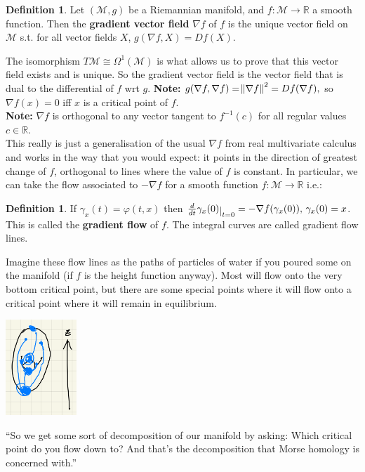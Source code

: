 \documentclass[10pt]{article}
\theoremstyle{plain}
\theoremstyle{definition}
\newtheorem{defn}[thm]{Definition} %
\newcommand{\Note}{\textbf{Note: }}
\newcommand{\Real}{\mathbb{R}}
\newcommand{\man}{\mathcal{M}}
\newcommand{\tangbundle}{T\man}
\newcommand{\deriv}{d}
\newcommand{\dt}{\deriv t}
\def\restrict#1{\raise-.5ex\hbox{\ensuremath|}_{#1}}
\begin{document}
\begin{defn}
    Let $(\man,g)$ be a Riemannian manifold, and $f:\man\to\Real$ a smooth function. Then the \textbf{gradient vector field} $\nabla f$ of $f$ is the unique vector field on $\man$ s.t. for all vector fields $X$, $g(\nabla f, X) = Df(X)$.
\end{defn}
The isomorphism $\tangbundle \cong \Omega^1(\man)$ is what allows us to prove that this vector field exists and is unique. So the gradient vector field is the vector field that is dual to the differential of $f$ wrt $g$.
\Note $g(\nabla f,\nabla f) = \norm{\nabla f}^2 = Df(\nabla f),$ so $\nabla f(x) = 0 $ iff $x$ is a critical point of $f$.\\
\Note $\nabla f$ is orthogonal to any vector tangent to $f^{-1}(c)$ for all regular values $c\in\Real.$\\
This really is just a generalisation of the usual $\nabla f$ from real multivariate calculus and works in the way that you would expect: it points in the direction of greatest change of $f$, orthogonal to lines where the value of $f$ is constant. In particular, we can take the flow associated to $-\nabla f$ for a smooth function $f:\man \to \Real $ i.e.: 
\begin{defn}
    If $\gamma_x(t) = \varphi(t,x)$ then $\frac{\deriv}{\dt} \gamma_x(0)\restrict{t=0} = -\nabla f(\gamma_x(0)), \, \gamma_x(0) = x$. This is called the \textbf{gradient flow} of $f$. The integral curves are called gradient flow lines.
\end{defn}
Imagine these flow lines as the paths of particles of water if you poured some on the manifold (if $f$ is the height function anyway). Most will flow onto the very bottom critical point, but there are some special points where it will flow onto a critical point where it will remain in equilibrium.
\begin{center}
    \includegraphics[width = 0.20\textwidth]{Images/WaterGradientFlowLines.png}
\end{center}
``So we get some sort of decomposition of our manifold by asking: Which critical point do you flow down to? And that's the decomposition that Morse homology is concerned with.''
\end{document}
